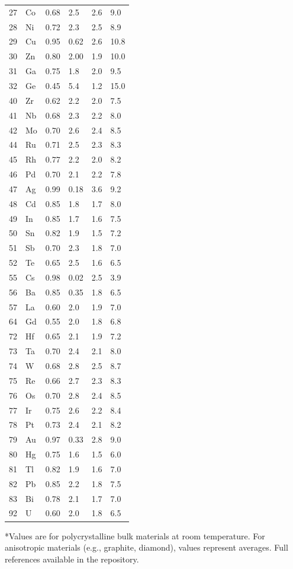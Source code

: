 \documentclass[12pt,a4paper]{article}
\begin{document}
\begin{longtable}{p{0.8cm}p{1.2cm}p{2.2cm}p{2.2cm}p{2.2cm}p{2.2cm}}
		27 & Co & 0.68 & 2.5 & 2.6 & 9.0 \\
		28 & Ni & 0.72 & 2.3 & 2.5 & 8.9 \\
		29 & Cu & 0.95 & 0.62 & 2.6 & 10.8 \\
		30 & Zn & 0.80 & 2.00 & 1.9 & 10.0 \\
		31 & Ga & 0.75 & 1.8 & 2.0 & 9.5 \\
		32 & Ge & 0.45 & 5.4 & 1.2 & 15.0 \\
		40 & Zr & 0.62 & 2.2 & 2.0 & 7.5 \\
		41 & Nb & 0.68 & 2.3 & 2.2 & 8.0 \\
		42 & Mo & 0.70 & 2.6 & 2.4 & 8.5 \\
		44 & Ru & 0.71 & 2.5 & 2.3 & 8.3 \\
		45 & Rh & 0.77 & 2.2 & 2.0 & 8.2 \\
		46 & Pd & 0.70 & 2.1 & 2.2 & 7.8 \\
		47 & Ag & 0.99 & 0.18 & 3.6 & 9.2 \\
		48 & Cd & 0.85 & 1.8 & 1.7 & 8.0 \\
		49 & In & 0.85 & 1.7 & 1.6 & 7.5 \\
		50 & Sn & 0.82 & 1.9 & 1.5 & 7.2 \\
		51 & Sb & 0.70 & 2.3 & 1.8 & 7.0 \\
		52 & Te & 0.65 & 2.5 & 1.6 & 6.5 \\
		55 & Cs & 0.98 & 0.02 & 2.5 & 3.9 \\
		56 & Ba & 0.85 & 0.35 & 1.8 & 6.5 \\
		57 & La & 0.60 & 2.0 & 1.9 & 7.0 \\
		64 & Gd & 0.55 & 2.0 & 1.8 & 6.8 \\
		72 & Hf & 0.65 & 2.1 & 1.9 & 7.2 \\
		73 & Ta & 0.70 & 2.4 & 2.1 & 8.0 \\
		74 & W  & 0.68 & 2.8 & 2.5 & 8.7 \\
		75 & Re & 0.66 & 2.7 & 2.3 & 8.3 \\
		76 & Os & 0.70 & 2.8 & 2.4 & 8.5 \\
		77 & Ir & 0.75 & 2.6 & 2.2 & 8.4 \\
		78 & Pt & 0.73 & 2.4 & 2.1 & 8.2 \\
		79 & Au & 0.97 & 0.33 & 2.8 & 9.0 \\
		80 & Hg & 0.75 & 1.6 & 1.5 & 6.0 \\
		81 & Tl & 0.82 & 1.9 & 1.6 & 7.0 \\
		82 & Pb & 0.85 & 2.2 & 1.8 & 7.5 \\
		83 & Bi & 0.78 & 2.1 & 1.7 & 7.0 \\
		92 & U  & 0.60 & 2.0 & 1.8 & 6.5 \\
		\bottomrule
	\end{longtable}
	*Values are for polycrystalline bulk materials at room temperature. For anisotropic materials (e.g., graphite, diamond), values represent averages. Full references available in the repository.
	
\end{document}
